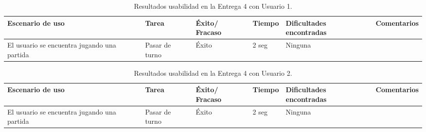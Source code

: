 \begin{table}[h]
  \begin{center}
    \begin{tabular}{|p{2.5cm}|p{1.75cm}|p{1.25cm}|p{1.25cm}|p{2.75cm}|p{3.5cm}|}

      \hline
        \rowcolor{Gray} \textbf{Escenario de uso}
        & \textbf{Tarea}
        & \textbf{Éxito/ Fracaso}
        & \textbf{Tiempo}
        & \textbf{Dificultades encontradas}
        & \textbf{Comentarios}\\

        \hline
        El usuario se encuentra jugando una partida
        & Pasar de turno
        & Éxito
        & 2 seg
        & Ninguna
        &\\

      \hline

    \end{tabular}

    \caption{Resultados usabilidad en la Entrega 4 con Usuario 1.}
    \label{tabla-entrega-4-usuario1}

  \end{center}
\end{table}


\begin{table}[h]
  \begin{center}
    \begin{tabular}{|p{2.5cm}|p{1.75cm}|p{1.25cm}|p{1.25cm}|p{2.75cm}|p{3.5cm}|}

      \hline
        \rowcolor{Gray} \textbf{Escenario de uso}
        & \textbf{Tarea}
        & \textbf{Éxito/ Fracaso}
        & \textbf{Tiempo}
        & \textbf{Dificultades encontradas}
        & \textbf{Comentarios}\\

        \hline
        El usuario se encuentra jugando una partida
        & Pasar de turno
        & Éxito
        & 2 seg
        & Ninguna
        &\\

      \hline

    \end{tabular}

    \caption{Resultados usabilidad en la Entrega 4 con Usuario 2.}
    \label{tabla-entrega-4-usuario2}

  \end{center}
\end{table}


